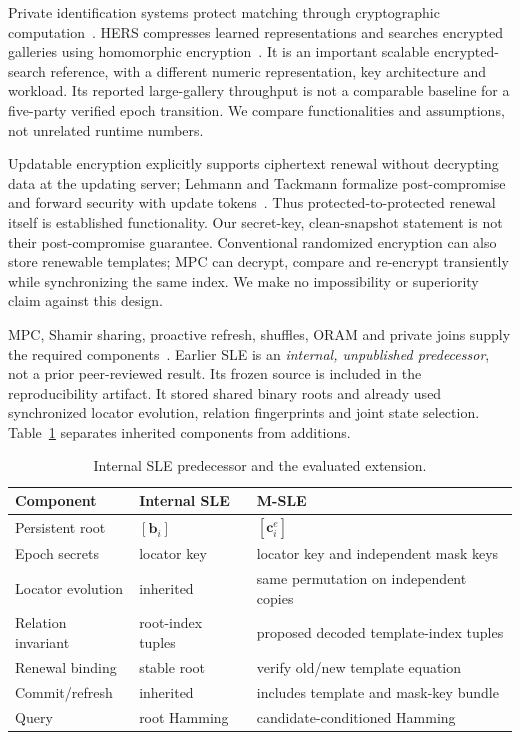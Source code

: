 \documentclass[journal]{IEEEtran}
\newcommand{\MSLE}{\textsc{M-SLE}\xspace}
\begin{document}
Private identification systems protect matching through cryptographic computation~\cite{franz2009privacyface,osadchy2010scifi}. HERS compresses learned representations and searches encrypted galleries using homomorphic encryption~\cite{engelsma2022hers}. It is an important scalable encrypted-search reference, with a different numeric representation, key architecture and workload. Its reported large-gallery throughput is not a comparable baseline for a five-party verified epoch transition. We compare functionalities and assumptions, not unrelated runtime numbers.

Updatable encryption explicitly supports ciphertext renewal without decrypting data at the updating server; Lehmann and Tackmann formalize post-compromise and forward security with update tokens~\cite{lehmann2018updatable}. Thus protected-to-protected renewal itself is established functionality. Our secret-key, clean-snapshot statement is not their post-compromise guarantee. Conventional randomized encryption can also store renewable templates; MPC can decrypt, compare and re-encrypt transiently while synchronizing the same index. We make no impossibility or superiority claim against this design.

MPC, Shamir sharing, proactive refresh, shuffles, ORAM and private joins supply the required components~\cite{shamir1979share,keller2020mpspdz,herzberg1995proactive,stefanov2013pathoram,mohassel2020joins}. Earlier SLE is an \emph{internal, unpublished predecessor}, not a prior peer-reviewed result. Its frozen source is included in the reproducibility artifact. It stored shared binary roots and already used synchronized locator evolution, relation fingerprints and joint state selection. Table~\ref{tab:extension} separates inherited components from additions.
\begin{table}[t]
\caption{Internal SLE predecessor and the evaluated extension.}
\label{tab:extension}\centering\small
\begin{tabularx}{\columnwidth}{p{}XX}
\toprule Component & Internal SLE & \MSLE \\
\midrule Persistent root & $[\mathbf b_i]$ & $[\mathbf c_i^e]$ \\
Epoch secrets & locator key & locator key and independent mask keys \\
Locator evolution & inherited & same permutation on independent copies \\
Relation invariant & root-index tuples & proposed decoded template-index tuples \\
Renewal binding & stable root & verify old/new template equation \\
Commit/refresh & inherited & includes template and mask-key bundle \\
Query & root Hamming & candidate-conditioned Hamming \\
\bottomrule
\end{tabularx}
\end{table}
\end{document}
